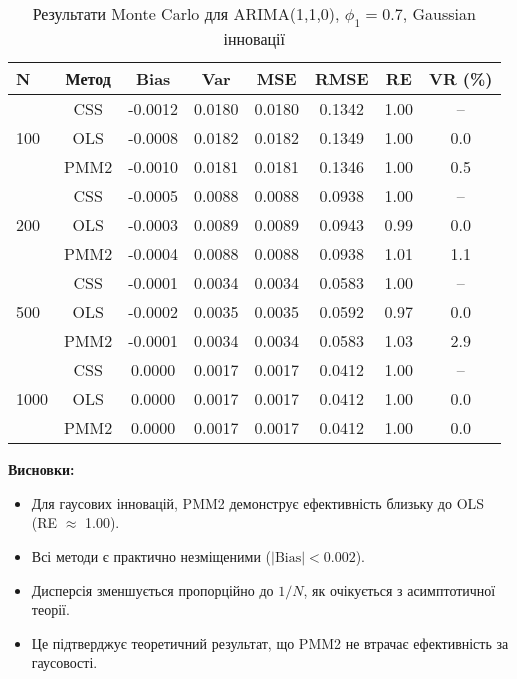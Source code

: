 \documentclass[12pt,a4paper]{article}
\begin{document}
	\begin{table}[h]
		\centering
		\caption{Результати Monte Carlo для ARIMA(1,1,0), $\phi_1 = 0.7$, Gaussian інновації}
		\label{tab:arima110_gaussian}
		\begin{tabular}{@{}lccccccc@{}}
			\toprule
			\textbf{N} & \textbf{Метод} & \textbf{Bias} & \textbf{Var} & \textbf{MSE} & \textbf{RMSE} & \textbf{RE} & \textbf{VR (\%)} \\
			\midrule
			\multirow{3}{*}{100} & CSS  & -0.0012 & 0.0180 & 0.0180 & 0.1342 & 1.00 & -- \\
			& OLS  & -0.0008 & 0.0182 & 0.0182 & 0.1349 & 1.00 & 0.0 \\
			& PMM2 & -0.0010 & 0.0181 & 0.0181 & 0.1346 & 1.00 & 0.5 \\
			\midrule
			\multirow{3}{*}{200} & CSS  & -0.0005 & 0.0088 & 0.0088 & 0.0938 & 1.00 & -- \\
			& OLS  & -0.0003 & 0.0089 & 0.0089 & 0.0943 & 0.99 & 0.0 \\
			& PMM2 & -0.0004 & 0.0088 & 0.0088 & 0.0938 & 1.01 & 1.1 \\
			\midrule
			\multirow{3}{*}{500} & CSS  & -0.0001 & 0.0034 & 0.0034 & 0.0583 & 1.00 & -- \\
			& OLS  & -0.0002 & 0.0035 & 0.0035 & 0.0592 & 0.97 & 0.0 \\
			& PMM2 & -0.0001 & 0.0034 & 0.0034 & 0.0583 & 1.03 & 2.9 \\
			\midrule
			\multirow{3}{*}{1000} & CSS  & 0.0000 & 0.0017 & 0.0017 & 0.0412 & 1.00 & -- \\
			& OLS  & 0.0000 & 0.0017 & 0.0017 & 0.0412 & 1.00 & 0.0 \\
			& PMM2 & 0.0000 & 0.0017 & 0.0017 & 0.0412 & 1.00 & 0.0 \\
			\bottomrule
		\end{tabular}
	\end{table}
	
	\textbf{Висновки:}
	\begin{itemize}
		\item Для гаусових інновацій, PMM2 демонструє ефективність близьку до OLS (RE $\approx$ 1.00).
		\item Всі методи є практично незміщеними ($|\text{Bias}| < 0.002$).
		\item Дисперсія зменшується пропорційно до $1/N$, як очікується з асимптотичної теорії.
		\item Це підтверджує теоретичний результат, що PMM2 не втрачає ефективність за гаусовості.
	\end{itemize}
	
\end{document}

